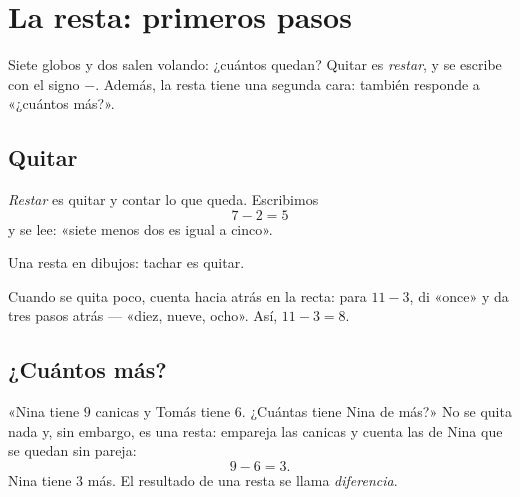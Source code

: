 \chapter{La resta: primeros pasos}\label{ch:g1:subtraction}

Siete globos y dos salen volando: ¿cuántos quedan? Quitar es
\emph{restar}, y se escribe con el signo $-$. Además, la resta tiene una
segunda cara: también responde a «¿cuántos más?».

\section{Quitar}

\begin{definition}[La resta]\label{def:g1:subtraction:def}
\emph{Restar} es quitar y contar lo que queda. Escribimos
\[
7 - 2 = 5
\]
y se lee: «siete menos dos es igual a cinco».
\end{definition}

\begin{omfigure}

{\small Una resta en dibujos: tachar es quitar.}
\end{omfigure}

\begin{example}\label{ex:g1:subtraction:countback}
Cuando se quita poco, cuenta hacia atrás en la recta: para $11 - 3$, di
«once» y da tres pasos atrás --- «diez, nueve, ocho». Así,
$11 - 3 = 8$.
\end{example}

\section{¿Cuántos más?}

\begin{example}[La diferencia]\label{ex:g1:subtraction:difference}
«Nina tiene $9$ canicas y Tomás tiene $6$. ¿Cuántas tiene Nina de más?»
No se quita nada y, sin embargo, es una resta: empareja las canicas
y cuenta las de Nina que se quedan sin pareja:
\[
9 - 6 = 3 .
\]
Nina tiene $3$ más. El resultado de una resta se llama
\emph{diferencia}.
\end{example}

